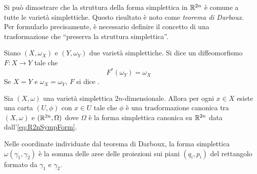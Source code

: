 Si può dimostrare che la struttura della forma simplettica in $\mathbb{R}^{2n}$ è comune a tutte le varietà simplettiche. Questo risultato è noto come \emph{teorema di Darboux}. Per formularlo precisamente, è necessario definire il concetto di una trasformazione che \textquotedblleft preserva la struttura simplettica\textquotedblright.

\begin{definition}
  Siano $(X, \omega_X)$ e $(Y, \omega_Y)$ due varietà simplettiche. Si dice  un diffeomorfismo $F:X\to Y$ tale che 
  \begin{equation*}
    F^*(\omega_Y) = \omega_X
  \end{equation*} 
  Se $X = Y$ e $\omega_X = \omega_Y$, $F$ si dice .
\end{definition}

\begin{theorem}[Darboux]
  Sia $(X,\omega)$ una varietà simplettica $2n$-dimensionale. Allora per ogni $x \in X$ esiste una carta $(U,\phi)$ con $x \in U$ tale che $\phi$ è una trasformazione canonica tra $(X,\omega)$ e $(\mathbb{R}^{2n}, \Omega)$ dove $\Omega$ è la forma simplettica canonica su $\mathbb{R}^{2n}$ data dall'\autoref{eq:R2nSympForm}.
\end{theorem}
\begin{remark}
  Nelle coordinate individuate dal teorema di Darboux, la forma simplettica $\omega(\gamma_1,\gamma_2)$ è la somma delle aree delle  proiezioni sui piani $(q_i, p_i)$ del rettangolo formato da $\gamma_1$ e $\gamma_2$.
\end{remark}

